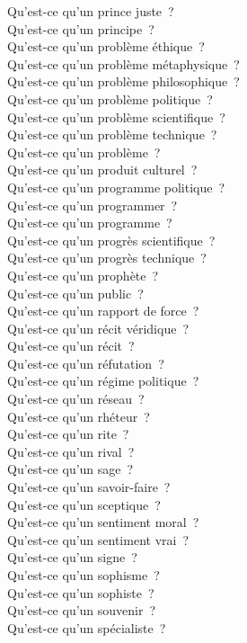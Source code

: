 \documentclass[a4paper,12pt]{article}
\begin{document}
Qu'est-ce qu'un prince juste ? \\
Qu'est-ce qu'un principe ? \\
Qu'est-ce qu'un problème éthique ? \\
Qu'est-ce qu'un problème métaphysique ? \\
Qu'est-ce qu'un problème philosophique ? \\
Qu'est-ce qu'un problème politique ? \\
Qu'est-ce qu'un problème scientifique ? \\
Qu'est-ce qu'un problème technique ? \\
Qu'est-ce qu'un problème ? \\
Qu'est-ce qu'un produit culturel ? \\
Qu'est-ce qu'un programme politique ? \\
Qu'est-ce qu'un programmer ? \\
Qu'est-ce qu'un programme ? \\
Qu'est-ce qu'un progrès scientifique ? \\
Qu'est-ce qu'un progrès technique ? \\
Qu'est-ce qu'un prophète ? \\
Qu'est-ce qu'un public ? \\
Qu'est-ce qu'un rapport de force ? \\
Qu'est-ce qu'un récit véridique ? \\
Qu'est-ce qu'un récit ? \\
Qu'est-ce qu'un réfutation ? \\
Qu'est-ce qu'un régime politique ? \\
Qu'est-ce qu'un réseau ? \\
Qu'est-ce qu'un rhéteur ? \\
Qu'est-ce qu'un rite ? \\
Qu'est-ce qu'un rival ? \\
Qu'est-ce qu'un sage ? \\
Qu'est-ce qu'un savoir-faire ? \\
Qu'est-ce qu'un sceptique ? \\
Qu'est-ce qu'un sentiment moral ? \\
Qu'est-ce qu'un sentiment vrai ? \\
Qu'est-ce qu'un signe ? \\
Qu'est-ce qu'un sophisme ? \\
Qu'est-ce qu'un sophiste ? \\
Qu'est-ce qu'un souvenir ? \\
Qu'est-ce qu'un spécialiste ? \\
\end{document}
